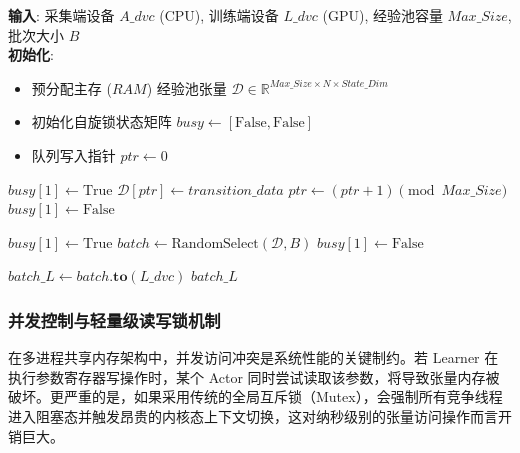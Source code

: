 \begin{algorithm}
\caption{共享数据中枢的异构张量流转与自旋锁控制伪代码}
\label{alg:shared_data}
\textbf{输入}: 采集端设备 $A\_dvc$ (CPU), 训练端设备 $L\_dvc$ (GPU), 经验池容量 $Max\_Size$, 批次大小 $B$\\
\textbf{初始化}: 
\begin{itemize}
    \vspace{-0.2cm}
    \item 预分配主存 ($RAM$) 经验池张量 $\mathcal{D} \in \mathbb{R}^{Max\_Size \times N \times State\_Dim}$
    \item 初始化自旋锁状态矩阵 $busy \leftarrow [\text{False}, \text{False}]$
    \item 队列写入指针 $ptr \leftarrow 0$
\end{itemize}
\vspace{-0.2cm}
\begin{algorithmic}[1]
 
     
        \State {} 
    \EndWhile
    \State $busy[1] \leftarrow \text{True}$ 
    \State $\mathcal{D}[ptr] \leftarrow transition\_data$ 
    \State $ptr \leftarrow (ptr + 1) \pmod{Max\_Size}$ 
    \State $busy[1] \leftarrow \text{False}$ 
\EndFunction

\State
{} 
        \State {} 
    \EndWhile
    \State $busy[1] \leftarrow \text{True}$
    \State $batch \leftarrow \text{RandomSelect}(\mathcal{D}, B)$ 
    \State $busy[1] \leftarrow \text{False}$
    
    \State $batch\_L \leftarrow batch\mathbf{.to}(L\_dvc)$ 
    \State \Return $batch\_L$ 
\EndFunction
\end{algorithmic}
\end{algorithm}

\subsubsection{并发控制与轻量级读写锁机制}

在多进程共享内存架构中，并发访问冲突是系统性能的关键制约。若 Learner 在执行参数寄存器写操作时，某个 Actor 同时尝试读取该参数，将导致张量内存被破坏。更严重的是，如果采用传统的全局互斥锁（Mutex），会强制所有竞争线程进入阻塞态并触发昂贵的内核态上下文切换，这对纳秒级别的张量访问操作而言开销巨大。

